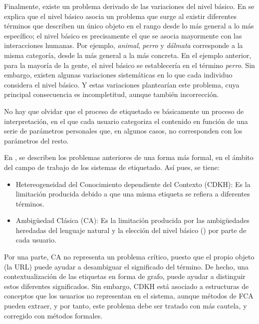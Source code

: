 Finalmente, existe un problema derivado de las variaciones del nivel básico. En \cite{tanaka} se explica que el nivel básico asocia un problema que surge al existir diferentes términos que describen un único objeto en el rango desde lo más general a lo más específico; el nivel básico es precisamente el que se asocia mayormente con las interacciones humanas. Por ejemplo, \emph{animal}, \emph{perro} y \emph{dálmata} corresponde a la misma categoría, desde la más general a la más concreta. En el ejemplo anterior, para la mayoría de la gente, el nivel básico se establecería en el término \emph{perro}. Sin embargo, existen algunas variaciones sistemáticas en lo que cada individuo considera el nivel básico. Y estas variaciones plantearían este problema, cuya principal consecuencia es incompletitud, aunque también incorrección.

No hay que olvidar que el proceso de etiquetado es básicamente un proceso de interpretación, en el que cada usuario categoriza el contenido en función de una serie de parámetros personales que, en algunos casos, no corresponden con los parámetros del resto.

En \cite{algoritmo}, se describen los problemas anteriores de una forma más formal, en el ámbito del campo de trabajo de los sistemas de etiquetado. Así pues, se tiene:
\begin{itemize}
	\item Hetereogeneidad del Conocimiento dependiente del Contexto (CDKH): Es la limitación producida debido a que una misma etiqueta se refiera a diferentes términos.
	\item Ambigüedad Clásica (CA): Es la limitación producida por las ambigüedades heredadas del lenguaje natural y la elección del nivel básico (\cite{tanaka}) por parte de cada usuario.
\end{itemize}

Por una parte, CA no representa un problema crítico, puesto que el propio objeto (la URL) puede ayudar a desambiguar el significado del término. De hecho, una contextualización de las etiquetas en forma de grafo, puede ayudar a distinguir estos diferentes significados. Sin embargo, CDKH está asociado a estructuras de conceptos que los usuarios no representan en el sistema, aunque métodos de FCA pueden extraer, y por tanto, este problema debe ser tratado con más cautela, y corregido con métodos formales.

